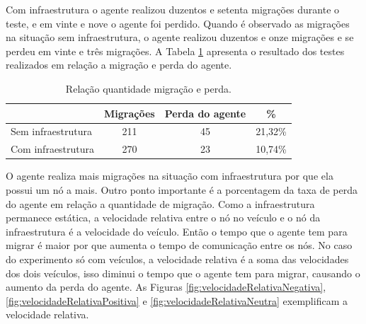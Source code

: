Com infraestrutura o agente realizou duzentos e setenta migrações durante o teste, e em vinte e nove o agente foi perdido. Quando é observado as migrações na situação sem infraestrutura, o agente realizou duzentos e onze migrações e se perdeu em vinte e três migrações. A Tabela \ref{tab:migracoesPerda} apresenta o resultado dos testes realizados em relação a migração e perda do agente.

\begin{table}[ht]
	\caption{Relação quantidade migração e perda.}
	\centering
	\begin{tabular}{ | l | c | c | c |}
		\hline
					& Migrações & Perda do agente & \% \\ \hline
		Sem infraestrutura & 211 & 45 & 21,32\%  \\ \hline
		Com infraestrutura & 270 & 23 & 10,74\%  \\ \hline
	\end{tabular}
	\label{tab:migracoesPerda}
\end{table}

O agente realiza mais migrações na situação com infraestrutura por que ela possui um nó a mais. Outro ponto importante é a porcentagem da taxa de perda do agente  em relação a quantidade de migração. Como a infraestrutura permanece estática, a velocidade relativa entre o nó no veículo e o nó da infraestrutura é a velocidade do veículo. Então o tempo que o agente tem para migrar é maior por que aumenta o tempo de comunicação entre os nós. No caso do experimento só com veículos, a velocidade relativa é a soma das velocidades dos dois veículos, isso diminui o tempo que o agente tem para migrar, causando o aumento da perda do agente. As Figuras \ref{fig:velocidadeRelativaNegativa}, \ref{fig:velocidadeRelativaPositiva} e \ref{fig:velocidadeRelativaNeutra} exemplificam a velocidade relativa.


